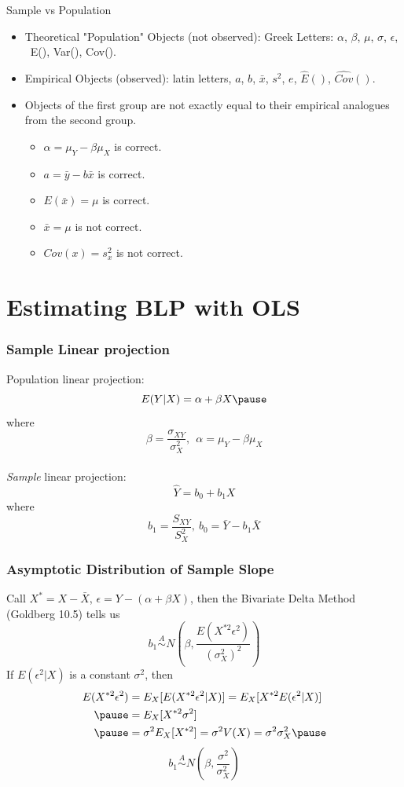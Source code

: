 \documentclass[aspectratio=169, handout]{beamer}
\numberwithin{equation}{section}
\begin{document}
\begin{frame}{Sample vs Population}
\begin{itemize}
\item Theoretical "Population" Objects (not observed): Greek Letters: $\alpha$, $\beta$, $\mu$, $\sigma$, $\epsilon$,  \ E(), Var(), Cov().
\item Empirical Objects (observed): latin letters, $a$, $b$, $\bar{x}$, $s^2$, $e$, $\widehat{E}()$, $\widehat{Cov}()$.
\item Objects of the first group are not exactly equal to their empirical analogues from the second group.
\begin{itemize}
\item $\alpha=\mu_Y-\beta\mu_X$ is correct.
\item $a=\bar{y}-b\bar{x}$ is correct.
\item $E(\bar{x})=\mu$ is correct.
\item $\bar{x}=\mu$ is not correct. 
\item $Cov(x)=s^2_x$ is not correct.
\end{itemize}
\end{itemize}
\end{frame}

\section{Estimating BLP with OLS}
\begin{frame}
\frametitle{Sample Linear projection}
Population linear projection:
$$E(Y|X)=\alpha+\beta X\pause$$
where $$\beta=\frac{\sigma_{XY}}{\sigma^2_X},\ \  \alpha=\mu_Y-\beta\mu_X$$\pause
\\
\emph{Sample} linear projection:
$$\hat{Y}=b_0+b_1X$$
where $$b_1=\frac{S_{XY}}{S^2_X},\ b_0=\bar{Y}-b_1\bar{X}$$

\end{frame}

\begin{frame}
\frametitle{Asymptotic Distribution of Sample Slope}
Call $X^*=X-\bar{X}$, $\epsilon=Y-(\alpha+\beta X)$, then the Bivariate Delta Method (Goldberg 10.5) tells us
$$b_1\stackrel{A}{\sim }N(\beta, \frac{E(X^{*2}\epsilon^2)}{(\sigma^2_X)^2})$$\pause
If $E(\epsilon^2|X)$ is a constant $\sigma^2$, then
\begin{align*}
E(X^{*2}\epsilon^2)&=E_X[E(X^{*2}\epsilon^2|X)]=E_X[X^{*2}E(\epsilon^2|X)]\\\pause
&=E_X[X^{*2}\sigma^2]\\\pause
&=\sigma^2E_X[X^{*2}]=\sigma^2V(X)=\sigma^2\sigma^2_X\pause
\end{align*} 
$$b_1\stackrel{A}{\sim }N(\beta, \frac{\sigma^2}{\sigma^2_X})$$
\end{frame}
\end{document}
